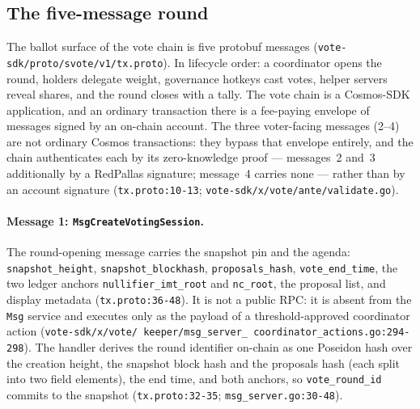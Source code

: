 \documentclass[11pt,a4paper]{article}
\theoremstyle{definition}
\begin{document}
\subsection{The five-message round}\label{sec:vote-messages}

The ballot surface of the vote chain is five protobuf messages
(\texttt{vote-sdk/proto/svote/v1/\allowbreak tx.proto}). In lifecycle order: a
coordinator opens the round, holders delegate weight, governance hotkeys
cast votes, helper servers reveal shares, and the round closes with a tally.
The vote chain is a Cosmos-SDK application, and an ordinary transaction
there is a fee-paying envelope of messages signed by an on-chain account.
The three voter-facing messages (2--4) are not ordinary Cosmos
transactions: they bypass that envelope entirely, and the chain
authenticates each by its zero-knowledge proof --- messages~2 and~3
additionally by a RedPallas signature; message~4 carries none --- rather
than by an account signature (\texttt{tx.proto:10-13};
\texttt{vote-sdk/x/vote/ante/\allowbreak validate.go}).

\paragraph{Message 1: \texttt{MsgCreateVotingSession}.} The round-opening
message carries the snapshot pin and the agenda: \texttt{snapshot\_height},
\texttt{snapshot\_blockhash}, \texttt{proposals\_hash},
\texttt{vote\_end\_time}, the two ledger anchors
\texttt{nullifier\_imt\_root} and \texttt{nc\_root}, the proposal list, and
display metadata (\texttt{tx.proto:36-48}). It is not a public RPC: it is
absent from the \texttt{Msg} service and executes only as the payload of a
threshold-approved coordinator action
(\texttt{vote-sdk/\allowbreak x/\allowbreak vote/\allowbreak
keeper/\allowbreak msg\_\allowbreak server\_\allowbreak
coordinator\_\allowbreak actions.go:294-298}).
The handler derives the round identifier on-chain as one Poseidon hash
over the creation height, the snapshot block hash and the proposals hash
(each split into two field elements), the end time, and both anchors, so
\texttt{vote\_round\_id} commits to the snapshot
(\texttt{tx.proto:32-35}; \texttt{msg\_server.go:30-48}).
\end{document}
